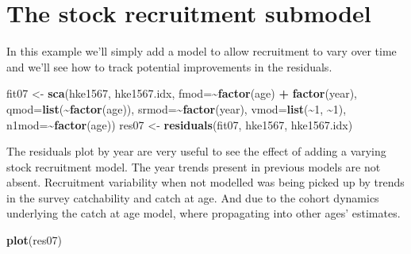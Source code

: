 \documentclass[
]{book}
\newenvironment{Shaded}{\begin{snugshade}}{\end{snugshade}}
\newcommand{\AttributeTok}[1]{\textcolor[rgb]{0.13,0.29,0.53}{#1}}
\newcommand{\DecValTok}[1]{\textcolor[rgb]{0.00,0.00,0.81}{#1}}
\newcommand{\FunctionTok}[1]{\textcolor[rgb]{0.13,0.29,0.53}{\textbf{#1}}}
\newcommand{\NormalTok}[1]{#1}
\newcommand{\OtherTok}[1]{\textcolor[rgb]{0.56,0.35,0.01}{#1}}
\newcommand{\SpecialCharTok}[1]{\textcolor[rgb]{0.81,0.36,0.00}{\textbf{#1}}}
\begin{document}
\hypertarget{the-stock-recruitment-submodel}{%
\section{The stock recruitment submodel}\label{the-stock-recruitment-submodel}}

In this example we'll simply add a model to allow recruitment to vary over time and we'll see how to track potential improvements in the residuals.

\begin{Shaded}
\begin{Highlighting}[]
\NormalTok{fit07 }\OtherTok{\textless{}{-}} \FunctionTok{sca}\NormalTok{(hke1567, hke1567.idx,}
    \AttributeTok{fmod=}\SpecialCharTok{\textasciitilde{}}\FunctionTok{factor}\NormalTok{(age) }\SpecialCharTok{+} \FunctionTok{factor}\NormalTok{(year),}
    \AttributeTok{qmod=}\FunctionTok{list}\NormalTok{(}\SpecialCharTok{\textasciitilde{}}\FunctionTok{factor}\NormalTok{(age)),}
    \AttributeTok{srmod=}\SpecialCharTok{\textasciitilde{}}\FunctionTok{factor}\NormalTok{(year),}
    \AttributeTok{vmod=}\FunctionTok{list}\NormalTok{(}\SpecialCharTok{\textasciitilde{}}\DecValTok{1}\NormalTok{, }\SpecialCharTok{\textasciitilde{}}\DecValTok{1}\NormalTok{),}
    \AttributeTok{n1mod=}\SpecialCharTok{\textasciitilde{}}\FunctionTok{factor}\NormalTok{(age))}
\NormalTok{res07 }\OtherTok{\textless{}{-}} \FunctionTok{residuals}\NormalTok{(fit07, hke1567, hke1567.idx)}
\end{Highlighting}
\end{Shaded}

The residuals plot by year are very useful to see the effect of adding a varying stock recruitment model. The year trends present in previous models are not absent. Recruitment variability when not modelled was being picked up by trends in the survey catchability and catch at age. And due to the cohort dynamics underlying the catch at age model, where propagating into other ages' estimates.

\begin{Shaded}
\begin{Highlighting}[]
\FunctionTok{plot}\NormalTok{(res07)}
\end{Highlighting}
\end{Shaded}
\end{document}
